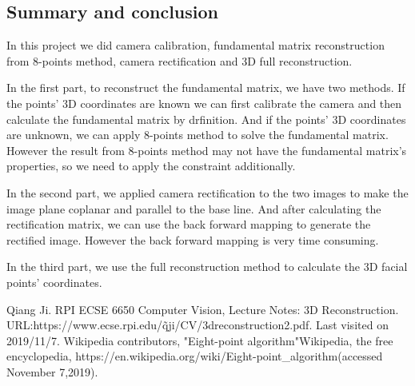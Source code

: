 \documentclass{article}
\begin{document}
\subsection*{Summary and conclusion}
\par
In this project we did camera calibration, fundamental matrix reconstruction from 8-points method, camera rectification and 3D full reconstruction.
\par
In the first part, to reconstruct the fundamental matrix, we have two methods. If the points' 3D coordinates are known we can first calibrate the camera and then calculate the fundamental matrix by drfinition. And if the points' 3D coordinates are unknown, we can apply 8-points method to solve the fundamental matrix. However the result from 8-points method may not have the fundamental matrix's properties, so we need to apply the constraint additionally.
\par
In the second part, we applied camera rectification to the two images to make the image plane coplanar and parallel to the base line. And after calculating the rectification matrix, we can use the back forward mapping to generate the rectified image. However the back forward mapping is very time consuming.
\par
In the third part, we use the full reconstruction method to calculate the 3D facial points' coordinates.
\newpage
\begin{thebibliography}{}  
Qiang Ji. RPI ECSE 6650 Computer Vision, Lecture Notes: 3D Reconstruction. URL:https://www.ecse.rpi.edu/\~qji/CV/3dreconstruction2.pdf. Last visited on 2019/11/7.
Wikipedia contributors, "Eight-point algorithm"Wikipedia, the free encyclopedia, https://en.wikipedia.org/wiki/Eight-point_algorithm(accessed November 7,2019).
\end{thebibliography}
\end{document}
